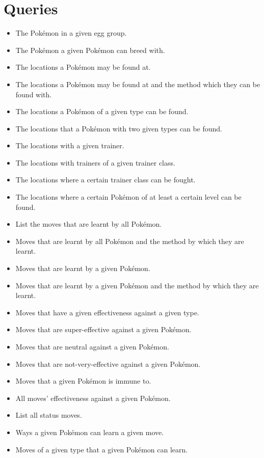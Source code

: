 \documentclass{article}
\begin{document}
\section{Queries}
\begin{itemize}
    \item The Pok\'emon in a given egg group.
    \item The Pok\'emon a given Pok\'emon can breed with.
    \item The locations a Pok\'emon may be found at.
    \item The locations a Pok\'emon may be found at and the method which they can be found with.
    \item The locations a Pok\'emon of a given type can be found.
    \item The locations that a Pok\'emon with two given types can be found.
    \item The locations with a given trainer.
    \item The locations with trainers of a given trainer class.
    \item The locations where a certain trainer class can be fought.
    \item The locations where a certain Pok\'emon of at least a certain level can be found.
    \item List the moves that are learnt by all Pok\'emon.
    \item Moves that are learnt by all Pok\'emon and the method by which they are learnt.
    \item Moves that are learnt by a given Pok\'emon.
    \item Moves that are learnt by a given Pok\'emon and the method by which they are learnt.
    \item Moves that have a given effectiveness against a given type.
    \item Moves that are super-effective against a given Pok\'emon.
    \item Moves that are neutral against a given Pok\'emon.
    \item Moves that are not-very-effective against a given Pok\'emon.
    \item Moves that a given Pok\'emon is immune to.
    \item All moves' effectiveness against a given Pok\'emon.
    \item List all status moves.
    \item Ways a given Pok\'emon can learn a given move.
    \item  Moves of a given type that a given Pok\'emon can learn.

\end{itemize}
\end{document}
